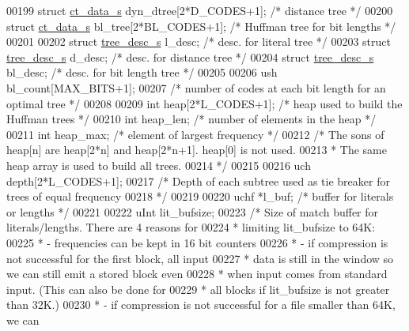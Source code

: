 \begin{DoxyCode}
00199     \textcolor{keyword}{struct }\hyperlink{structct__data__s}{ct\_data\_s} dyn\_dtree[2*D\_CODES+1]; \textcolor{comment}{/* distance tree */}
00200     \textcolor{keyword}{struct }\hyperlink{structct__data__s}{ct\_data\_s} bl\_tree[2*BL\_CODES+1];  \textcolor{comment}{/* Huffman tree for bit lengths */}
00201 
00202     \textcolor{keyword}{struct }\hyperlink{structtree__desc__s}{tree\_desc\_s} l\_desc;               \textcolor{comment}{/* desc. for literal tree */}
00203     \textcolor{keyword}{struct }\hyperlink{structtree__desc__s}{tree\_desc\_s} d\_desc;               \textcolor{comment}{/* desc. for distance tree */}
00204     \textcolor{keyword}{struct }\hyperlink{structtree__desc__s}{tree\_desc\_s} bl\_desc;              \textcolor{comment}{/* desc. for bit length tree */}
00205 
00206     ush bl\_count[MAX\_BITS+1];
00207     \textcolor{comment}{/* number of codes at each bit length for an optimal tree */}
00208 
00209     \textcolor{keywordtype}{int} heap[2*L\_CODES+1];      \textcolor{comment}{/* heap used to build the Huffman trees */}
00210     \textcolor{keywordtype}{int} heap\_len;               \textcolor{comment}{/* number of elements in the heap */}
00211     \textcolor{keywordtype}{int} heap\_max;               \textcolor{comment}{/* element of largest frequency */}
00212     \textcolor{comment}{/* The sons of heap[n] are heap[2*n] and heap[2*n+1]. heap[0] is not used.}
00213 \textcolor{comment}{     * The same heap array is used to build all trees.}
00214 \textcolor{comment}{     */}
00215 
00216     uch depth[2*L\_CODES+1];
00217     \textcolor{comment}{/* Depth of each subtree used as tie breaker for trees of equal frequency}
00218 \textcolor{comment}{     */}
00219 
00220     uchf *l\_buf;          \textcolor{comment}{/* buffer for literals or lengths */}
00221 
00222     uInt  lit\_bufsize;
00223     \textcolor{comment}{/* Size of match buffer for literals/lengths.  There are 4 reasons for}
00224 \textcolor{comment}{     * limiting lit\_bufsize to 64K:}
00225 \textcolor{comment}{     *   - frequencies can be kept in 16 bit counters}
00226 \textcolor{comment}{     *   - if compression is not successful for the first block, all input}
00227 \textcolor{comment}{     *     data is still in the window so we can still emit a stored block even}
00228 \textcolor{comment}{     *     when input comes from standard input.  (This can also be done for}
00229 \textcolor{comment}{     *     all blocks if lit\_bufsize is not greater than 32K.)}
00230 \textcolor{comment}{     *   - if compression is not successful for a file smaller than 64K, we can}

\end{DoxyCode}
